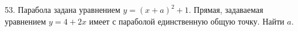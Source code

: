 53. Парабола задана уравнением $y=(x+a)^2+1.$ Прямая, задаваемая уравнением $y=4+2x$ имеет с параболой единственную общую точку. Найти $a.$\\
